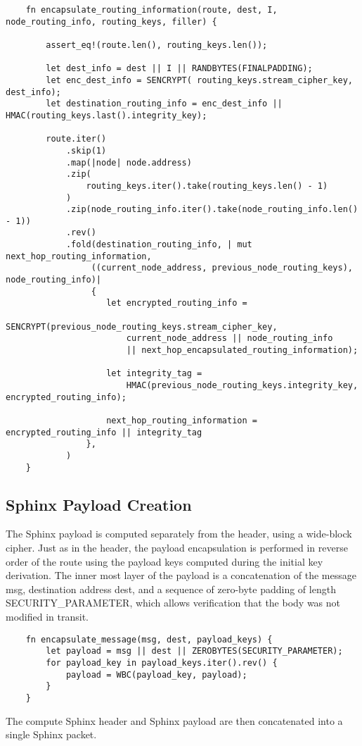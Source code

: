 \begin{verbatim}
    fn encapsulate_routing_information(route, dest, I, node_routing_info, routing_keys, filler) {
        
        assert_eq!(route.len(), routing_keys.len());
        
        let dest_info = dest || I || RANDBYTES(FINALPADDING);
        let enc_dest_info = SENCRYPT( routing_keys.stream_cipher_key, dest_info);
        let destination_routing_info = enc_dest_info || HMAC(routing_keys.last().integrity_key);
        
        route.iter()
            .skip(1)
            .map(|node| node.address)
            .zip(
                routing_keys.iter().take(routing_keys.len() - 1)
            )
            .zip(node_routing_info.iter().take(node_routing_info.len() - 1))
            .rev()
            .fold(destination_routing_info, | mut next_hop_routing_information,
                 ((current_node_address, previous_node_routing_keys), node_routing_info)| 
                 {
                    let encrypted_routing_info =
                    SENCRYPT(previous_node_routing_keys.stream_cipher_key, 
                        current_node_address || node_routing_info 
                        || next_hop_encapsulated_routing_information);
                        
                    let integrity_tag = 
                        HMAC(previous_node_routing_keys.integrity_key, encrypted_routing_info);
                    
                    next_hop_routing_information = encrypted_routing_info || integrity_tag
                },
            )
    }
\end{verbatim}

\subsection{Sphinx Payload Creation}\label{sec:payload_create}

The Sphinx payload is computed separately from the header, using a wide-block cipher. Just as in the header, the payload encapsulation is performed in reverse order of the route using the payload keys computed during the initial key derivation. The inner most layer of the payload is a concatenation of the message msg, destination address dest, and a sequence of zero-byte padding of length SECURITY\_PARAMETER, which allows verification that the body was not modified in transit. 

\begin{verbatim}
    fn encapsulate_message(msg, dest, payload_keys) {
        let payload = msg || dest || ZEROBYTES(SECURITY_PARAMETER); 
        for payload_key in payload_keys.iter().rev() {
            payload = WBC(payload_key, payload);
        }
    }
\end{verbatim}

The compute Sphinx header and Sphinx payload are then concatenated into a single Sphinx packet. 
